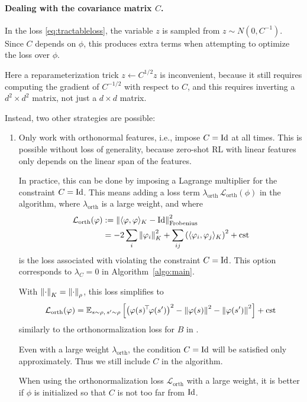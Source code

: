 \documentclass[11pt,a4paper]{article}
\newcommand{\loss}{\mathcal{L}}
\newcommand{\orth}{_\mathrm{orth}}
\begin{document}
\paragraph{Dealing with the covariance matrix $C$.} In the loss
\eqref{eq:tractableloss}, the variable $z$ is sampled from $z\sim
N(0,C^{-1})$. Since $C$ depends on $\phi$, this produces extra terms when
attempting to optimize the loss over $\phi$.

Here a reparameterization trick $z\gets C^{1/2}z$ is inconvenient,
because it still requires computing the gradient of $C^{-1/2}$ with
respect to $C$, and this requires inverting a $d^2\times d^2$ matrix, not
just a $d\times d$ matrix.

Instead, two other strategies are possible:
\begin{enumerate}
\item Only work with orthonormal features, i.e., impose $C=\operatorname{Id}$ at all
times. This is possible without loss of generality, because zero-shot RL
with linear features only depends on the linear span of the features.

In practice, this can be done by imposing a Lagrange multiplier for the
constraint $C=\operatorname{Id}$. This means adding a loss term $\lambda\orth\,
\loss\orth(\phi)$ in the algorithm, where $\lambda\orth$ is a large
weight, and where
\begin{align}
\label{eq:lossorth}
\loss\orth(\phi)& \deq  \norm{\langle
\phi,\phi\rangle_K-\Id}^2_{\mathrm{Frobenius}}
\\&=-2\sum_i \norm{\phi_i}_K^2
+\sum_{ij} \left(\langle \phi_i,\phi_j\rangle_K\right)^2
+\mathrm{cst}
\end{align}
is the loss associated with violating the constraint $C=\operatorname{Id}$.
This option corresponds to $\lambda_C=0$ in Algorithm~\ref{algo:main}.

With $\left\lVert\cdot\right\rVert_K=\left\lVert\cdot\right\rVert_\rho$, this loss simplifies to
\begin{equation}
\loss\orth(\phi)=\E_{s\sim \rho,\,s'\sim \rho}\left[
\left(\transp{\phi(s)}\phi(s')\right)^2-\norm{\phi(s)}^2-\norm{\phi(s')}^2
\right]+\mathrm{cst}
\end{equation}
similarly to the orthonormalization loss for $B$ in \cite{zeroshot}.

Even with a large weight $\lambda\orth$, the condition $C=\operatorname{Id}$ will be
satisfied only approximately. Thus we still include $C$ in the algorithm.

When using the orthonormalization loss $\loss\orth$ with a large weight,
it is better if $\phi$ is initialized so that $C$ is not too far from
$\operatorname{Id}$.


\end{enumerate}
\end{document}
